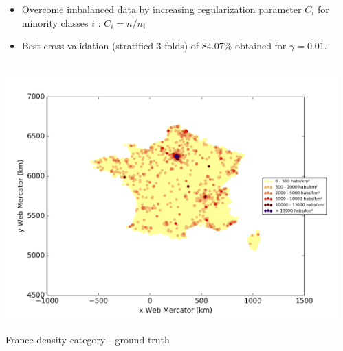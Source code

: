 \documentclass[c]{beamer}
\begin{document}
\begin{frame}
\begin{itemize}
\item Overcome imbalanced data by increasing regularization parameter $C_{i}$ for minority classes $i$ :  $C_{i} = n/n_{i}$
\item Best cross-validation (stratified 3-folds) of $84.07$\% obtained for $\gamma = 0.01$.
\end{itemize}
\end{frame}
\begin{frame}

\begin{columns}
 \begin{column}{0.5\textwidth}
  \begin{overlayarea}{\linewidth}{4cm}
    \centering\vfill
    \includegraphics[scale=0.25]{../../data/France/test/Support_Vector_Gaussian_Classification/Support_Vector_Gaussian_Classification/density_ground_truth.png}
  \end{overlayarea}
  \begin{overlayarea}{\linewidth}{0.5cm}
    \centering
    \tiny France density category - ground truth\par
  \end{overlayarea}
 \end{column}
 \begin{column}{0.5\textwidth}
  \begin{overlayarea}{\linewidth}{4cm}
    \centering\vfill

\end{overlayarea}
\end{column}
\end{columns}
\end{frame}
\end{document}
